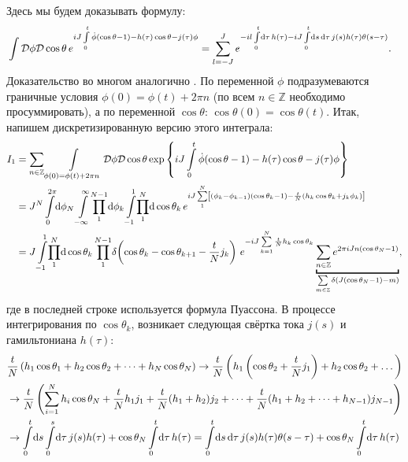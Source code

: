 
Здесь мы будем доказывать формулу:
\begin{equation}
	\label{eq:IntWithSource}
	\begin{split}
		&\int\mathcal{D}\phi \mathcal{D}\cos{\theta}\, e^{iJ\int\limits_0^t \dot{\phi}(\cos{\theta} - 1) - h(\tau)\cos{\theta} - j(\tau)\phi}=\sum\limits_{l=-J}^J e^{-i l \int\limits_0^t\!\mathrm{d} \tau\, h(\tau)-iJ \int\limits_0^t\!\mathrm{d} s\, \mathrm{d} \tau\, j(s) h(\tau) \theta(s - \tau)}.
	\end{split}
\end{equation}
Доказательство во многом аналогично \cite{Mnev}. По переменной $\phi$ подразумеваются граничные условия $\phi(0)=\phi(t)+2\pi n$ (по всем $n\in \mathbb{Z}$ необходимо просуммировать), а по переменной $\cos{\theta}$: $\cos{\theta(0)}=\cos{\theta(t)}$. Итак, напишем дискретизированную версию этого интеграла:
\begin{align*}
	I_1&=\sum\limits_{n\in \mathbb{Z}} \int\limits_{\phi(0)=\phi(t)+2\pi n}\mathcal{D}\phi \mathcal{D}\cos{\theta} \exp{\left\{ iJ\int\limits_0^t \dot{\phi}(\cos{\theta} - 1) - h(\tau)\cos{\theta} - j(\tau)\phi \right\}}\\
	&= J^N \int\limits_0^{2\pi} \!\D \phi_N \int\limits_{-\infty}^\infty \! \prod\limits_1^{N-1}\!\D \phi_k \int\limits_{-1}^1\!\prod\limits_1^N\!\D\cos{\theta_k}\,e^{ iJ\sum\limits_1^N \left[ (\phi_k - \phi_{k-1})(\cos{\theta_k} - 1) - \frac{t}{N}(h_k \cos{\theta_k} +j_k \phi_k) \right]}\\
	&= J \int\limits_{-1}^1\!\prod_1^N\! \D\cos{\theta_k} \prod_1^{N-1}\!\delta\!\left(\cos{\theta_k} - \cos{\theta_{k+1}} - \frac{t}{N}j_k\right)\,e^{-iJ\sum\limits_{k=1}^N \frac{t}{N}h_k\cos{\theta_k}}\underbracket{\sum\limits_{n\in \mathbb{Z}} e^{2\pi i Jn(\cos{\theta_N}-1)}}_{\sum\limits_{m\in \mathbb{Z}} \delta(J(\cos{\theta_N} - 1) - m)},\\
\end{align*}
где в последней строке используется  формула Пуассона. В процессе интегрирования по $\cos{\theta_k}$, возникает следующая свёртка тока $j(s)$ и гамильтониана $h(\tau)$:
\begin{align*}
	&\frac tN\left( h_1\cos{\theta_1} + h_2\cos{\theta_2} + \dots + h_N\cos{\theta_N} \right) \to \frac tN\left(h_1\left(\cos{\theta_2} + \frac tN j_1\right) + h_2\cos{\theta_2} + \dots\right)\\
	&\to \frac tN\left(\sum\limits_{i=1}^N h_i\cos{\theta_N} + \frac tN h_1 j_1 + \frac tN (h_1 + h_2) j_2 + \dots + \frac tN (h_1 + h_2 + \dots + h_{N-1})j_{N-1}\right)\\
	&\to \int\limits_0^t \!\mathrm{d} s\int\limits_0^s\!\mathrm{d} \tau \,j(s)h(\tau) + \cos{\theta_N}\int\limits_0^t\! \mathrm{d}\tau\, h(\tau) = \int\limits_0^t \!\mathrm{d} s\, \mathrm{d} \tau \,j(s)h(\tau)\theta(s-\tau) + \cos{\theta_N}\int\limits_0^t\! \mathrm{d}\tau\, h(\tau)
\end{align*}
